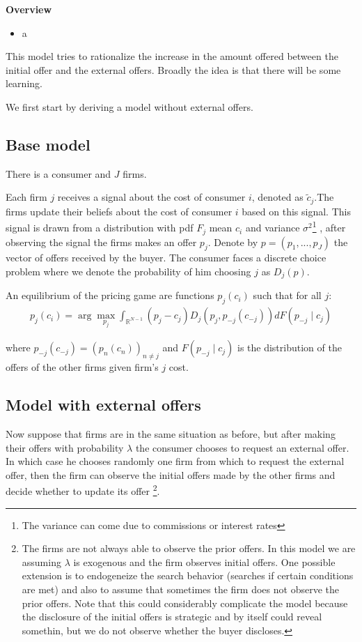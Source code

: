 \documentclass[12pt]{article}
\begin{document}
\textbf{Overview}

\begin{itemize}
    \item a
\end{itemize}

This model tries to rationalize the increase in the amount offered between the initial offer and the external offers. Broadly the idea is that there will be some learning. 

We first start by deriving a model without external offers. 

\subsection{Base model }
There is a consumer and $J$ firms. 

Each firm $j$ receives a signal about the cost of consumer $i$, denoted as $\tilde{c}_{j}$.The firms update their beliefs about the cost of consumer $i$ based on this signal.
This signal is drawn from a distribution with pdf $F_j$ mean $c_i$ and variance $\sigma^2$\footnote{The variance can come due to commissions or interest rates} , after observing the signal the firms makes an offer $p_j$.  Denote by $p = (p_1, ..., p_J)$ the vector of offers received by the buyer.  The consumer faces a discrete choice problem where we denote the probability of him choosing $j$ as $D_j(p)$. 

An equilibrium of the pricing game are functions $p_j(c_i)$ such that for all $j$:
\begin{align}
\label{eq:base_equilibrium}
    p_j(c_i) = \arg \max_{p_j} \int_{\mathbb{R}^{N-1}}^{} (p_j - c_j) D_j(p_j, p_{-j}(c_{-j})) dF(p_{-j} \mid c_j)
\end{align} 

where $p_{-j}(c_{-j}) = (p_n(c_n))_{n \neq j}$ and $F(p_{-j} \mid c_j)$ is the distribution of the offers of the other firms given firm's $j$ cost. 

\subsection{Model with external offers}

Now suppose that firms are in the same situation as before, but after making their offers with probability $\lambda$ the consumer chooses to request an external offer. In which case he chooses randomly one firm from which to request the external offer, then the firm can observe the initial offers made by the other firms and decide whether to update its offer \footnote{The firms are not always able to observe the prior offers. In this model we are assuming $\lambda$ is exogenous and the firm observes initial offers. One possible extension is to endogeneize the search behavior (searches if certain conditions are met) and also to assume that sometimes the firm does not observe the prior offers. Note that this could considerably complicate the model because the disclosure of the initial offers is strategic and by itself could reveal somethin, but we do not observe whether the buyer discloses. }.
\end{document}
